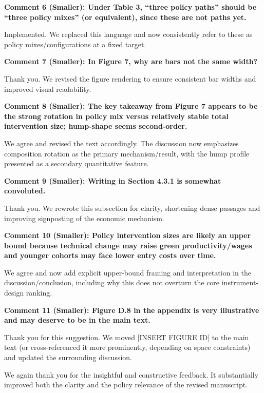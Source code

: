 \documentclass[12pt]{article}
\begin{document}
\begin{onehalfspacing}
\bigskip
\bigskip

\textbf{Comment 6 (Smaller): Under Table 3, ``three policy paths'' should be ``three policy mixes'' (or equivalent), since these are not paths yet.}

\medskip

Implemented. We replaced this language and now consistently refer to these as policy mixes/configurations at a fixed target.

\bigskip
\bigskip

\textbf{Comment 7 (Smaller): In Figure 7, why are bars not the same width?}

\medskip

Thank you. We revised the figure rendering to ensure consistent bar widths and improved visual readability.

\bigskip
\bigskip

\textbf{Comment 8 (Smaller): The key takeaway from Figure 7 appears to be the strong rotation in policy mix versus relatively stable total intervention size; hump-shape seems second-order.}

\medskip

We agree and revised the text accordingly. The discussion now emphasizes composition rotation as the primary mechanism/result, with the hump profile presented as a secondary quantitative feature.

\bigskip
\bigskip

\textbf{Comment 9 (Smaller): Writing in Section 4.3.1 is somewhat convoluted.}

\medskip

Thank you. We rewrote this subsection for clarity, shortening dense passages and improving signposting of the economic mechanism.

\bigskip
\bigskip

\textbf{Comment 10 (Smaller): Policy intervention sizes are likely an upper bound because technical change may raise green productivity/wages and younger cohorts may face lower entry costs over time.}

\medskip

We agree and now add explicit upper-bound framing and interpretation in the discussion/conclusion, including why this does not overturn the core instrument-design ranking.

\bigskip
\bigskip

\textbf{Comment 11 (Smaller): Figure D.8 in the appendix is very illustrative and may deserve to be in the main text.}

\medskip

Thank you for this suggestion. We moved [INSERT FIGURE ID] to the main text (or cross-referenced it more prominently, depending on space constraints) and updated the surrounding discussion.

\bigskip

We again thank you for the insightful and constructive feedback. It substantially improved both the clarity and the policy relevance of the revised manuscript.

\end{onehalfspacing}
\end{document}
